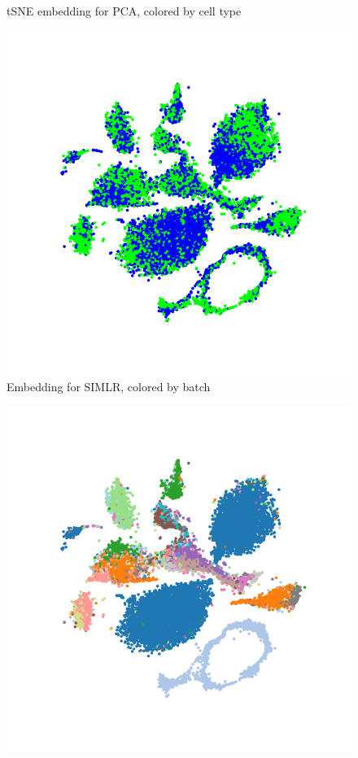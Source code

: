 \begin{suppfigure}[htp]
\begin{subfigure}[b]{0.3\textwidth}
        \caption{tSNE embedding for PCA, colored by cell type}
    \end{subfigure}
  \hspace{5pt}
    \begin{subfigure}[b]{0.3\textwidth}
        \includegraphics[width=\textwidth]{figures/SIMLR_tSNE_bipolar_batch.png}
        \caption{Embedding for SIMLR, colored by batch}
    \end{subfigure}
  \hspace{5pt}
      \begin{subfigure}[b]{0.3\textwidth}
        \includegraphics[width=\textwidth]{figures/SIMLR_tSNE_bipolar_clusters.png}

\end{subfigure}
\end{suppfigure}
